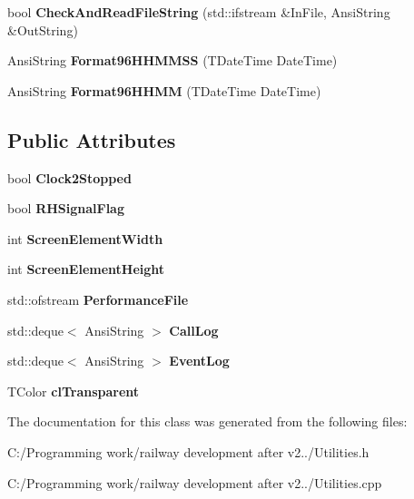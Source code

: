 \begin{DoxyCompactItemize}
\item 
\mbox{\label{class_t_utilities_a0a0ef5bf2fc74c0026f2a8bec4151d37}} 
bool {\bfseries Check\+And\+Read\+File\+String} (std\+::ifstream \&In\+File, Ansi\+String \&Out\+String)
\item 
\mbox{\label{class_t_utilities_a2dfbe3d4ed11770bc1a902b51afdc10c}} 
Ansi\+String {\bfseries Format96\+H\+H\+M\+M\+SS} (T\+Date\+Time Date\+Time)
\item 
\mbox{\label{class_t_utilities_a6dc0e83b149563fdf43f068fd26cead8}} 
Ansi\+String {\bfseries Format96\+H\+H\+MM} (T\+Date\+Time Date\+Time)
\end{DoxyCompactItemize}
\subsection*{Public Attributes}
\begin{DoxyCompactItemize}
\item 
\mbox{\label{class_t_utilities_a0fd0d8e0ec95309b508fd37fa541555e}} 
bool {\bfseries Clock2\+Stopped}
\item 
\mbox{\label{class_t_utilities_a3c2a72a2871d92ccaced9ab9f91d65c2}} 
bool {\bfseries R\+H\+Signal\+Flag}
\item 
\mbox{\label{class_t_utilities_ac9422864dc36c3d98ad952f10026c572}} 
int {\bfseries Screen\+Element\+Width}
\item 
\mbox{\label{class_t_utilities_a45d9703729a28c2fb2638539fa909e81}} 
int {\bfseries Screen\+Element\+Height}
\item 
\mbox{\label{class_t_utilities_acc7cd1d066ac7942ad6c1239b3c25eee}} 
std\+::ofstream {\bfseries Performance\+File}
\item 
\mbox{\label{class_t_utilities_abf6c3e70d5fbf58720ff0d9f80de5bde}} 
std\+::deque$<$ Ansi\+String $>$ {\bfseries Call\+Log}
\item 
\mbox{\label{class_t_utilities_ace6be5cece5f2e271c0b85a9d2f51917}} 
std\+::deque$<$ Ansi\+String $>$ {\bfseries Event\+Log}
\item 
\mbox{\label{class_t_utilities_a89b8716bbc78332d40427ed688ce56bd}} 
T\+Color {\bfseries cl\+Transparent}
\end{DoxyCompactItemize}


The documentation for this class was generated from the following files\+:\begin{DoxyCompactItemize}
\item 
C\+:/\+Programming work/railway development after v2../Utilities.\+h\item 
C\+:/\+Programming work/railway development after v2../Utilities.\+cpp\end{DoxyCompactItemize}
